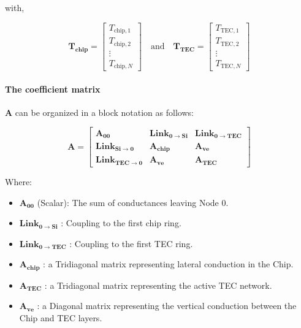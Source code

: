 \documentclass[10pt,a4paper,twocolumn]{article}
\begin{document}
with,

\begin{equation}
  \mathbf{T_{\text{chip}}}=
  \begin{bmatrix}
    T_{\text{chip},1} \\
    T_{\text{chip},2} \\
    \vdots \\
    T_{\text{chip},N}
  \end{bmatrix}
  \quad \text{and} \quad
  \mathbf{T_{\text{TEC}}}=
  \begin{bmatrix}
    T_{\text{TEC},1} \\
    T_{\text{TEC},2} \\
    \vdots \\
    T_{\text{TEC},N}
  \end{bmatrix}
\end{equation}

\paragraph{The coefficient matrix} $\mathbf{A}$ can be organized in a block notation as follows:

\begin{equation}
   \mathbf{A} = 
   \begin{bmatrix} \mathbf{A_{00}} & \mathbf{Link_{0 \to Si}} & \mathbf{Link_{0 \to TEC}} \\ \mathbf{Link_{Si \to 0}} & \mathbf{A_{chip}} & \mathbf{A_{ve}} \\ \mathbf{Link_{TEC \to 0}} & \mathbf{A_{ve}} & \mathbf{A_{TEC}} 
  \end{bmatrix}
\end{equation}

Where: 
\begin{itemize}
\item $\mathbf{A_{00}}$ (Scalar): The sum of conductances leaving Node 0.
\item $\mathbf{Link_{0 \to Si}}$ : Coupling to the first chip ring.
\item $\mathbf{Link_{0 \to TEC}}$ : Coupling to the first TEC ring.
\item $\mathbf{A_{chip}}$ : a Tridiagonal matrix representing lateral conduction in the Chip. 
\item $\mathbf{A_{TEC}}$ : a Tridiagonal matrix representing the active TEC network. 
\item $\mathbf{A_{ve}}$ : a Diagonal matrix representing the vertical conduction between the Chip and TEC layers.
\end{itemize}
\end{document}
